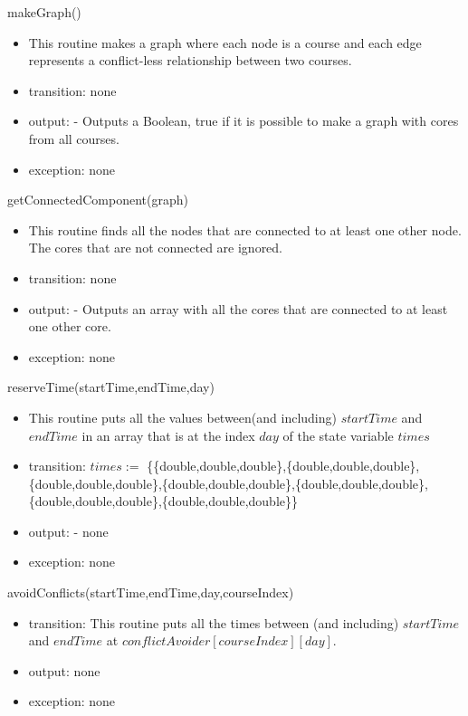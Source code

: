 \documentclass[11pt, oneside]{article}
\begin{document}
\noindent
makeGraph()
\begin{itemize}
\item This routine makes a graph where each node is a course and each edge represents a conflict-less relationship between two courses.
\item transition: none
\item output: - Outputs a Boolean, true if it is possible to make a graph with cores from all courses.
 \item exception: none
\end{itemize}

\noindent
getConnectedComponent(graph)
\begin{itemize}
\item This routine finds all the nodes that are connected to at least one other node. The cores that are not connected are ignored.
\item transition: none
\item output: - Outputs an array with all the cores that are connected to at least one other core.
 \item exception: none
\end{itemize}

\noindent
reserveTime(startTime,endTime,day)
\begin{itemize}
\item This routine puts all the values between(and including) $startTime$ and $endTime$ in an array that is at the index $day$ of the state variable $times$
\item transition: $times:=$ \{\{double,double,double\},\{double,double,double\},\{double,double,double\},\newline\{double,double,double\},\{double,double,double\},\{double,double,double\},\{double,double,double\}\}
\item output: - none
 \item exception: none
\end{itemize}

\noindent
avoidConflicts(startTime,endTime,day,courseIndex)
\begin{itemize}
\item transition: This routine puts all the times between (and including) $startTime$ and $endTime$ at $conflictAvoider[courseIndex][day]$.
\item output: none
 \item exception: none
\end{itemize}
\end{document}
